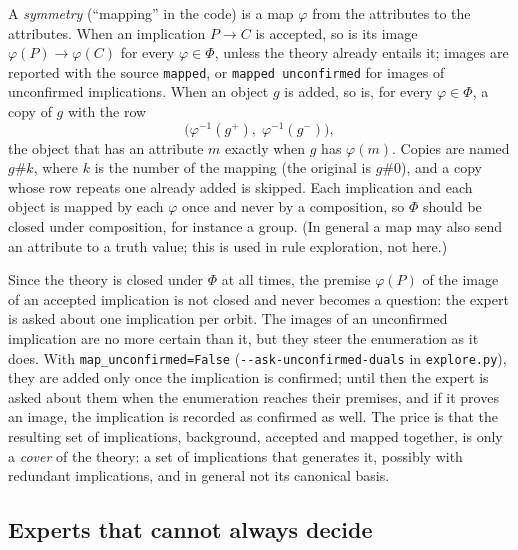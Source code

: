 \documentclass[11pt,a4paper]{article}
\theoremstyle{definition}
\theoremstyle{remark}
\newcommand{\code}[1]{\texttt{#1}}
\newcommand{\pos}{^{+}}
\newcommand{\nega}{^{-}}
\begin{document}
A \emph{symmetry} (``mapping'' in the code) is a map $\varphi$ from the attributes to the attributes. When an implication $P \to C$ is accepted, so is its image $\varphi(P) \to \varphi(C)$ for every $\varphi \in \Phi$, unless the theory already entails it; images are reported with the source \code{mapped}, or \code{mapped unconfirmed} for images of unconfirmed implications. When an object $g$ is added, so is, for every $\varphi \in \Phi$, a copy of $g$ with the row
\[
  \bigl(\varphi^{-1}(g\pos), \; \varphi^{-1}(g\nega)\bigr),
\]
the object that has an attribute $m$ exactly when $g$ has $\varphi(m)$. Copies are named $g\#k$, where $k$ is the number of the mapping (the original is $g\#0$), and a copy whose row repeats one already added is skipped. Each implication and each object is mapped by each $\varphi$ once and never by a composition, so $\Phi$ should be closed under composition, for instance a group. (In general a map may also send an attribute to a truth value; this is used in rule exploration, not here.)

Since the theory is closed under $\Phi$ at all times, the premise $\varphi(P)$ of the image of an accepted implication is not closed and never becomes a question: the expert is asked about one implication per orbit. The images of an unconfirmed implication are no more certain than it, but they steer the enumeration as it does. With \code{map\_unconfirmed=False} (\code{-{}-ask-unconfirmed-duals} in \code{explore.py}), they are added only once the implication is confirmed; until then the expert is asked about them when the enumeration reaches their premises, and if it proves an image, the implication is recorded as confirmed as well. The price is that the resulting set of implications, background, accepted and mapped together, is only a \emph{cover} of the theory: a set of implications that generates it, possibly with redundant implications, and in general not its canonical basis.

\subsection{Experts that cannot always decide}\label{sec:undecided}
\end{document}

